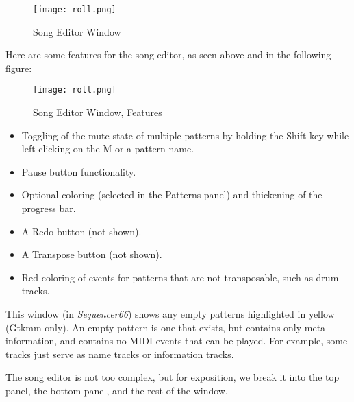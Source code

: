 \begin{figure}[H]
   \centering 
   \texttt{[image: roll.png]}
   \caption{Song Editor Window}
   \label{fig:song_editor_window}
\end{figure}

   Here are some features for the song editor, as
   seen above and in the following figure:

\begin{figure}[H]
   \centering 
   \texttt{[image: roll.png]}
   \caption{Song Editor Window, Features}
   \label{fig:song_editor_window_new_features}
\end{figure}

   \begin{itemize}
      \item Toggling of the mute state of multiple patterns by holding the
         Shift key while left-clicking on the M or a pattern name.
      \item Pause button functionality.
      \item Optional coloring (selected in the Patterns panel)
         and thickening of the progress bar.
      \item A Redo button (not shown).
      \item A Transpose button (not shown).
      \item Red coloring of events for patterns that are not transposable, such
         as drum tracks.
   \end{itemize}

   This window (in \textsl{Sequencer66}) shows any empty patterns
   highlighted in yellow (Gtkmm only).
   An empty pattern is one that exists, but
   contains only meta information, and contains no MIDI events that
   can be played.  For example, some tracks just serve as name tracks or
   information tracks.
   
   The song editor is not too complex, but for exposition, we break it into
   the top panel, the bottom panel, and the rest of the window.

%


